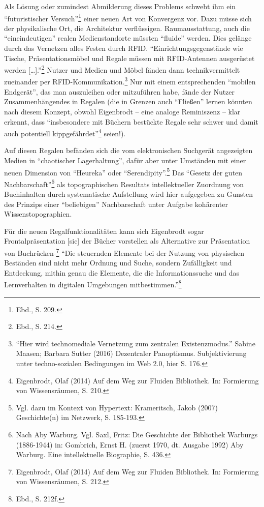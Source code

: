 \documentclass[a4paper,
fontsize=11pt,
oneside,
numbers=noperiodatend,
parskip=half-,
bibliography=totoc,
final
]{scrartcl}
\begin{document}
Als Lösung oder zumindest Abmilderung dieses Problems schwebt ihm ein
\enquote{futuristischer Versuch}\footnote{Ebd., S. 209.} einer neuen Art
von Konvergenz vor. Dazu müsse sich der physikalische Ort, die
Architektur verflüssigen. Raumausstattung, auch die
\enquote{eineindeutigen} realen Medienstandorte müssten \enquote{fluide}
werden. Dies gelänge durch das Vernetzen alles Festen durch RFID.
\enquote{Einrichtungsgegenstände wie Tische, Präsentationsmöbel und
Regale müssen mit RFID-Antennen ausgerüstet werden
{[}\ldots{}{]}.}\footnote{Ebd., S. 214.} Nutzer und Medien und Möbel
fänden dann technikvermittelt zueinander per
RFID-Kommunikation.\footnote{\enquote{Hier wird technomediale Vernetzung
  zum zentralen Existenzmodus.} Sabine Maasen; Barbara Sutter (2016)
  Dezentraler Panoptismus. Subjektivierung unter techno-sozialen
  Bedingungen im Web 2.0, hier S. 176.} Nur mit einem entsprechenden
\enquote{mobilen Endgerät}, das man auszuleihen oder mitzuführen habe,
fände der Nutzer Zusammenhängendes in Regalen (die in Grenzen auch
\enquote{Fließen} lernen könnten nach diesem Konzept, obwohl Eigenbrodt
-- eine analoge Reminiszenz -- klar erkennt, dass \enquote{insbesondere
mit Büchern bestückte Regale sehr schwer und damit auch potentiell
kippgefährdet}\footnote{Eigenbrodt, Olaf (2014) Auf dem Weg zur Fluiden
  Bibliothek. In: Formierung von Wissensräumen, S. 210.} seien!).

Auf diesen Regalen befänden sich die vom elektronischen Suchgerät
angezeigten Medien in \enquote{chaotischer Lagerhaltung}, dafür aber
unter Umständen mit einer neuen Dimension von \enquote{Heureka} oder
\enquote{Serendipity}.\footnote{Vgl. dazu im Kontext von Hypertext:
  Krameritsch, Jakob (2007) Geschichte(n) im Netzwerk, S. 185-193.} Das
\enquote{Gesetz der guten Nachbarschaft}\footnote{Nach Aby Warburg. Vgl.
  Saxl, Fritz: Die Geschichte der Bibliothek Warburgs (1886-1944) in:
  Gombrich, Ernst H. (zuerst 1970, dt. Ausgabe 1992) Aby Warburg. Eine
  intellektuelle Biographie, S. 436.} als topographischen Resultats
intellektueller Zuordnung von Buchinhalten durch systematische
Aufstellung wird hier aufgegeben zu Gunsten des Prinzips einer
\enquote{beliebigen} Nachbarschaft unter Aufgabe kohärenter
Wissenstopographien.

Für die neuen Regalfunktionalitäten kann sich Eigenbrodt sogar
Frontalpräsentation {[}sic{]} der Bücher vorstellen als Alternative zur
Präsentation von Buchrücken-\footnote{Eigenbrodt, Olaf (2014) Auf dem
  Weg zur Fluiden Bibliothek. In: Formierung von Wissensräumen, S. 212.}
\enquote{Die steuernden Elemente bei der Nutzung von physischen
Beständen sind nicht mehr Ordnung und Suche, sondern Zufälligkeit und
Entdeckung, mithin genau die Elemente, die die Informationssuche und das
Lernverhalten in digitalen Umgebungen mitbestimmen.}\footnote{Ebd., S.
  212f.}
\end{document}

